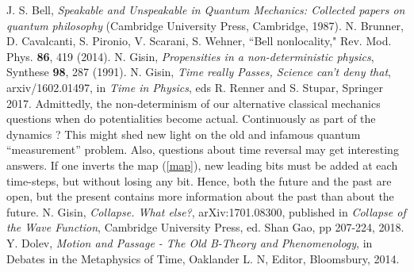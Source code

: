 \documentclass[pra,aps,groupedaddress,twocolumn,floatfix,nofootinbib]{revtex4}
\begin{document}
\begin{thebibliography}{99}
 J. S.  Bell,
      \textit{Speakable and Unspeakable in Quantum Mechanics:
      Collected papers on quantum philosophy} 
      (Cambridge University Press, Cambridge, 1987).
 N. Brunner, D. Cavalcanti, S. Pironio, V. Scarani, S. Wehner, ``Bell nonlocality," Rev. Mod. Phys. {\bf 86}, 419 (2014).
 N. Gisin, {\it Propensities in a non-deterministic physics}, Synthese {\bf 98}, 287 (1991).
 N. Gisin, {\it Time really Passes, Science can't deny that}, arxiv/1602.01497, in {\it Time in Physics}, eds R. Renner and S. Stupar, Springer 2017.
 Admittedly, the non-determinism of our alternative classical mechanics questions when do potentialities become actual. Continuously as part of the dynamics \cite{CollapseWhatElse}? This might shed new light on the old and infamous quantum ``measurement'' problem. Also, questions about time reversal may get interesting answers. If one inverts the map (\ref{map}), new leading bits must be added at each time-steps, but without losing any bit. Hence, both the future and the past are open, but the present contains more information about the past than about the future.
 N. Gisin, {\it Collapse. What else?}, arXiv:1701.08300, published in {\it Collapse of the Wave Function}, Cambridge University Press, ed. Shan Gao, pp 207-224, 2018.
 Y. Dolev, {\it Motion and Passage - The Old B-Theory and Phenomenology}, in Debates in the Metaphysics of Time,  Oaklander L. N, Editor, Bloomsbury, 2014.

\end{thebibliography}
\end{document}
